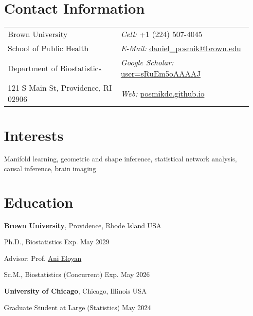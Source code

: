 \documentclass[margin,line]{res}
\newenvironment{list1}{
  \begin{list}{\ding{113}}{%
      \setlength{\itemsep}{0in}
      \setlength{\parsep}{0in} \setlength{\parskip}{0in}
      \setlength{\topsep}{0in} \setlength{\partopsep}{0in} 
      \setlength{\leftmargin}{0.17in}}}{\end{list}}
\begin{document}

\begin{resume}
\section{\sc Contact Information}
\vspace{.05in}
\begin{tabular}{@{}p{3in}p{4in}}
Brown University & {\it Cell:} +1 (224) 507-4045 \\ 
School of Public Health & {\it E-Mail:} \href{mailto:daniel_posmik@brown.edu}{daniel\_posmik@brown.edu} \\ 
Department of Biostatistics & {\it Google Scholar:} \href{https://scholar.google.com/citations?user=sRuEm5oAAAAJ}{user=sRuEm5oAAAAJ} \\
121 S Main St, Providence, RI 02906 & {\it Web:} \href{https://posmikdc.github.io}{posmikdc.github.io} \\       
\end{tabular}

\section{\sc Interests}
Manifold learning, geometric and shape inference, statistical network analysis, causal inference, brain imaging

\section{\sc Education}
{\bf Brown University}, Providence, Rhode Island USA\\
\vspace*{-.15in}
\begin{list1}
  \item[] Ph.D., Biostatistics \hfill Exp. May 2029

\begin{list1}
\vspace*{.05in}
\item[\cdot] Advisor: Prof. \href{http://www.anieloyan.com}{Ani Eloyan}
\end{list1}
\vspace*{.03in}
\item[] Sc.M., Biostatistics (Concurrent) \hfill Exp. May 2026
\end{list1}

{\bf University of Chicago}, Chicago, Illinois USA\\
\vspace*{-.15in}
\begin{list1}
\item[] Graduate Student at Large (Statistics) \hfill May 2024
\end{list1}


\end{resume}
\end{document}
